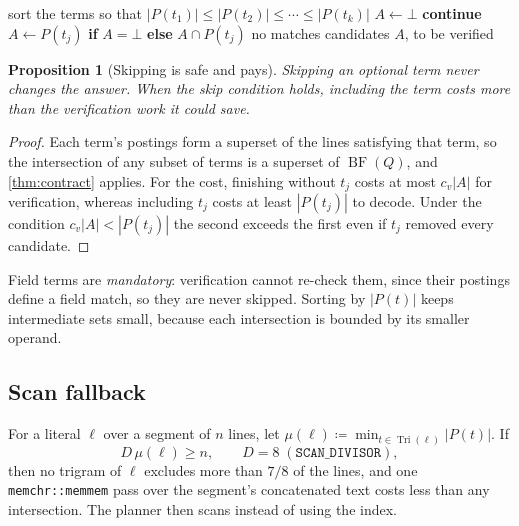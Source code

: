\documentclass[11pt]{article}
\theoremstyle{plain}
\newtheorem{proposition}[theorem]{Proposition}
\theoremstyle{definition}
\theoremstyle{remark}
\newcommand{\Tri}{\operatorname{Tri}}
\newcommand{\BF}{\operatorname{BF}}
\newcommand{\code}[1]{\texttt{#1}}
\newcommand{\abs}[1]{\left\lvert #1 \right\rvert}
\begin{document}
\begin{algorithm}[htbp]
\caption{Rarest-first intersection with early stop}\label{alg:plan}
\begin{algorithmic}[1]
\State sort the terms so that $\abs{P(t_1)} \le \abs{P(t_2)} \le \cdots \le \abs{P(t_k)}$
\State $A \gets \bot$
  \If{$A \ne \bot$ \textbf{and} $t_j$ is optional \textbf{and} $c_v \abs{A} < \abs{P(t_j)}$}
    \State \textbf{continue} 
  \EndIf
  \State $A \gets P(t_j)$ \textbf{if} $A = \bot$ \textbf{else} $A \cap P(t_j)$
   \Return no matches \EndIf
\EndFor
\State \Return candidates $A$, to be verified
\end{algorithmic}
\end{algorithm}

\begin{proposition}[Skipping is safe and pays]\label{prop:skip}
Skipping an optional term never changes the answer. When the skip condition
holds, including the term costs more than the verification work it could save.
\end{proposition}

\begin{proof}
Each term's postings form a superset of the lines satisfying that term, so the
intersection of any subset of terms is a superset of $\BF(Q)$, and
\cref{thm:contract} applies. For the cost, finishing without $t_j$ costs at most
$c_v \abs{A}$ for verification, whereas including $t_j$ costs at least
$\abs{P(t_j)}$ to decode. Under the condition $c_v \abs{A} < \abs{P(t_j)}$ the
second exceeds the first even if $t_j$ removed every candidate.
\end{proof}

Field terms are \emph{mandatory}: verification cannot re-check them, since their
postings define a field match, so they are never skipped. Sorting by
$\abs{P(t)}$ keeps intermediate sets small, because each intersection is bounded
by its smaller operand.

\subsection{Scan fallback}

For a literal $\ell$ over a segment of $n$ lines, let
$\mu(\ell) \coloneqq \min_{t \in \Tri(\ell)} \abs{P(t)}$. If
\begin{equation}\label{eq:scan}
  D\,\mu(\ell) \ge n, \qquad D = 8 \;(\code{SCAN\_DIVISOR}),
\end{equation}
then no trigram of $\ell$ excludes more than $7/8$ of the lines, and one
\code{memchr::memmem} pass over the segment's concatenated text costs less than
any intersection. The planner then scans instead of using the index.
\end{document}
